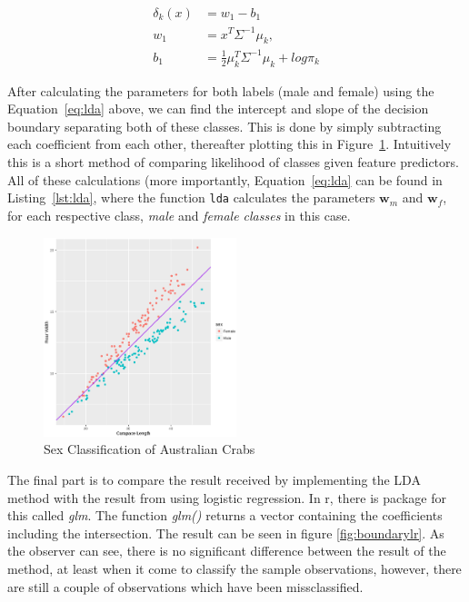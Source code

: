 \documentclass[a4paper, twocolumn]{article}
\begin{document}
        \begin{equation} \label{eq:lda}
          \begin{split}
            \delta_k(x) &=  w_1 - b_1 \\
            w_1 &= x^{T}\Sigma^{-1}\mu_k, \\
            b_1 &= \frac{1}{2}\mu_k^{T}\Sigma^{-1}\mu_k+log\pi_k
          \end{split}
        \end{equation}

        After calculating the parameters for both labels (male and female) using the Equation~\ref{eq:lda} above, we can find the intercept and slope of the decision boundary
        separating both of these classes. This is done by simply subtracting each coefficient from each other, thereafter plotting this in Figure~\ref{fig:boundary}. Intuitively this
        is a short method of comparing likelihood of classes given feature predictors. All of these calculations (more importantly, Equation~\ref{eq:lda} can be found in Listing~\ref{lst:lda},
        where the function \texttt{lda} calculates the parameters $\mathbf{w}_m$ and $\mathbf{w}_f$, for each respective class, \emph{male} and \emph{female classes} in this case.

        \begin{figure}
          \centering
          \caption{Sex Classification of Australian Crabs}
          \label{fig:boundary}
          \includegraphics[width=0.5\textwidth]{share/boundary.eps}
        \end{figure}

       The final part is to compare the result received by implementing the LDA method with the result from using logistic regression. In r, there is package for this called \textit{glm}. 
	   The function \textit{glm()} returns a vector containing the coefficients including the intersection. The result can be seen in figure \ref{fig:boundarylr}. As the observer can see, there
	   is no significant difference between the result of the method, at least when it come to classify the sample observations, however, there are still a couple of observations which have been
       missclassified.
\end{document}
